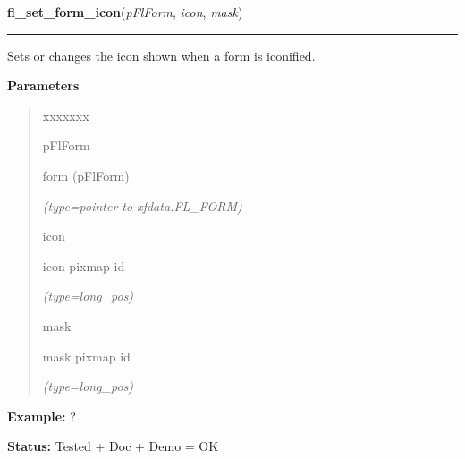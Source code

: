 \hspace{.8\funcindent}\begin{boxedminipage}{\funcwidth}

    \raggedright \textbf{fl\_set\_form\_icon}(\textit{pFlForm}, \textit{icon}, \textit{mask})

    \vspace{-1.5ex}

    \rule{\textwidth}{0.5\fboxrule}
\setlength{\parskip}{2ex}
    Sets or changes the icon shown when a form is iconified.

\setlength{\parskip}{1ex}
      \textbf{Parameters}
      \vspace{-1ex}

      \begin{quote}
        \begin{Ventry}{xxxxxxx}

          \item[pFlForm]

          form (pFlForm)

            {\it (type=pointer to xfdata.FL\_FORM)}

          \item[icon]

          icon pixmap id

            {\it (type=long\_pos)}

          \item[mask]

          mask pixmap id

            {\it (type=long\_pos)}

        \end{Ventry}

      \end{quote}

\textbf{Example:} ?



\textbf{Status:} Tested + Doc + Demo = OK



    \end{boxedminipage}

    \label{xformslib:flxbasic:fl_get_decoration_sizes}

    \vspace{0.5ex}

